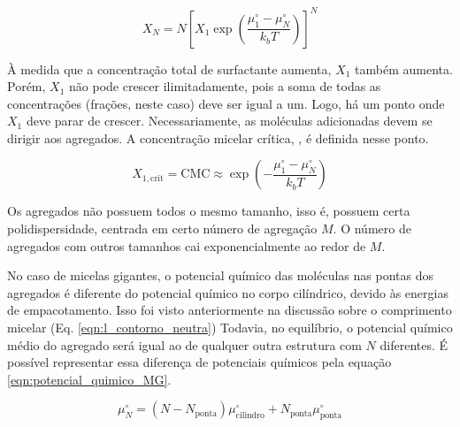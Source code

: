 		\begin{equation}
			X_N = N \left[ X_1 \exp \left(\dfrac{\mu_1^\circ - \mu_N^\circ}{k_b T}\right) \right] ^ N
			\label{eqn:termodinamica_diferenca_potencial_tamanho}
		\end{equation} 
		
		À medida que a concentração total de surfactante aumenta, \(X_1\) também aumenta. Porém, \(X_1\) não pode crescer ilimitadamente, pois a soma de todas as concentrações (frações, neste caso) deve ser igual a um. Logo, há um ponto onde \(X_1\) deve parar de crescer. Necessariamente, as moléculas adicionadas devem se dirigir aos agregados. A concentração micelar crítica, \cmc, é definida nesse ponto.
		
		\begin{equation}
			X_{1, \mathrm{crit}} = \mathrm{CMC} \approx \exp \left(  - \dfrac{\mu_1^\circ - \mu_N^\circ}{k_b T} \right)
			\label{eqn:cmc_termodinamica}
		\end{equation}  %
		
		Os agregados não possuem todos o mesmo tamanho, isso é, possuem certa polidispersidade, centrada em certo número de agregação \(M\). O número de agregados com outros tamanhos cai exponencialmente ao redor de \(M\). 
		
		No caso de micelas gigantes, o potencial químico das moléculas nas pontas dos agregados é diferente do potencial químico no corpo cilíndrico, devido às energias de empacotamento. Isso foi visto anteriormente na discussão sobre o comprimento micelar (Eq. \ref{eqn:l_contorno_neutra}) Todavia, no equilíbrio, o potencial químico médio do agregado será igual ao de qualquer outra estrutura com \(N\) diferentes. É possível representar essa diferença de potenciais químicos pela equação \ref{eqn:potencial_quimico_MG}.
		
		\begin{equation}
			\mu_N^\circ = \left( N - N_\mathrm{ponta} \right) \mu_\mathrm{cilindro}^\circ + N_\mathrm{ponta}\mu_\mathrm{ponta}^\circ
			\label{eqn:potencial_quimico_MG}
		\end{equation} %
		
%		
		
